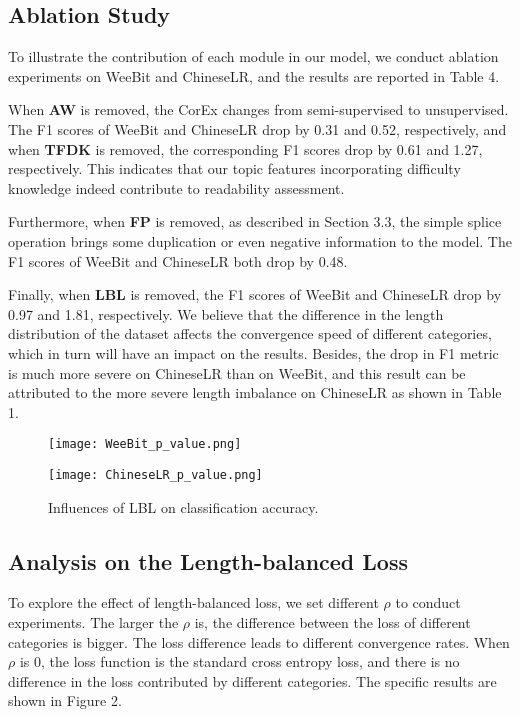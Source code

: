 \documentclass[11pt]{article}
\begin{document}
\subsection{Ablation Study}
To illustrate the contribution of each module in our model, we conduct ablation experiments on WeeBit and ChineseLR, and the results are reported in Table 4.


When \textbf{AW} is removed, the CorEx changes from semi-supervised to unsupervised. The F1 scores of WeeBit and ChineseLR drop by 0.31 and 0.52, respectively, and when \textbf{TFDK} is removed, the corresponding F1 scores drop by 0.61 and 1.27, respectively. This indicates that our topic features incorporating difficulty knowledge indeed contribute to readability assessment.


Furthermore, when \textbf{FP} is removed, as described in Section 3.3, the simple splice operation brings some duplication or even negative information to the model. The F1 scores of WeeBit and ChineseLR both drop by 0.48.


Finally, when \textbf{LBL} is removed, the F1 scores of WeeBit and ChineseLR drop by 0.97 and 1.81, respectively. We believe that the difference in the length distribution of the dataset affects the convergence speed of different categories, which in turn will have an impact on the results. Besides, 
the drop in F1 metric is much more severe on ChineseLR than on WeeBit, and this result can be attributed to the more severe length imbalance on ChineseLR as shown in Table 1.







\begin{figure*}
\begin{minipage}[t]{0.5\linewidth}
\centering
\texttt{[image: WeeBit\_p\_value.png]}
\label{fig:side:a}
\end{minipage}\begin{minipage}[t]{0.5\linewidth}
\centering
\texttt{[image: ChineseLR\_p\_value.png]}
\label{fig:side:b}
\end{minipage}
\caption{Influences of LBL on classification accuracy.}
\end{figure*}



\subsection{Analysis on the Length-balanced Loss}
To explore the effect of length-balanced loss, we set different $\rho$ to conduct experiments. The larger the $\rho$ is, the difference between the loss of different categories is bigger. The loss difference leads to different convergence rates.
When $\rho$ is 0, the loss function is the standard cross entropy loss, and there is no difference in the loss contributed by different categories. The specific results are shown in Figure 2.
\end{document}
